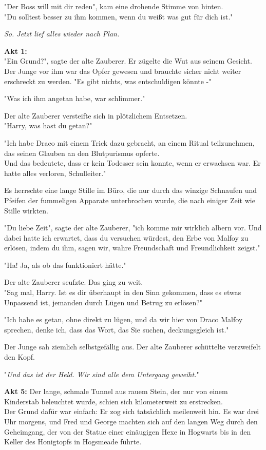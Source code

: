 {"Der Boss will mit dir reden", kam eine drohende Stimme von hinten.\\ "Du solltest besser zu ihm kommen, wenn du weißt was gut für dich ist."

\emph{So. Jetzt lief alles wieder nach Plan.}

\textbf{Akt 1:}\\ "Ein Grund?", sagte der alte Zauberer. Er zügelte die Wut aus seinem Gesicht.\\ Der Junge vor ihm war das Opfer gewesen und brauchte sicher nicht weiter erschreckt zu werden. "Es gibt nichts, was entschuldigen könnte -"

"Was ich ihm angetan habe, war schlimmer."

Der alte Zauberer versteifte sich in plötzlichem Entsetzen.\\ "Harry, was hast du getan?"

"Ich habe Draco mit einem Trick dazu gebracht, an einem Ritual teilzunehmen, das seinen Glauben an den Blutpurismus opferte.\\ Und das bedeutete, dass er kein Todesser sein konnte, wenn er erwachsen war. Er hatte alles verloren, Schulleiter."

Es herrschte eine lange Stille im Büro, die nur durch das winzige Schnaufen und Pfeifen der fummeligen Apparate unterbrochen wurde, die nach einiger Zeit wie Stille wirkten.

"Du liebe Zeit", sagte der alte Zauberer, "ich komme mir wirklich albern vor. Und dabei hatte ich erwartet, dass du versuchen würdest, den Erbe von Malfoy zu erlösen, indem du ihm, sagen wir, wahre Freundschaft und Freundlichkeit zeigst."

"Ha! Ja, als ob das funktioniert hätte."

Der alte Zauberer seufzte. Das ging zu weit.\\ "Sag mal, Harry. Ist es dir überhaupt in den Sinn gekommen, dass es etwas Unpassend ist, jemanden durch Lügen und Betrug zu erlösen?"

"Ich habe es getan, ohne direkt zu lügen, und da wir hier von Draco Malfoy sprechen, denke ich, dass das Wort, das Sie suchen, deckungsgleich ist."

Der Junge sah ziemlich selbstgefällig aus. Der alte Zauberer schüttelte verzweifelt den Kopf.

"\emph{Und das ist der Held. Wir sind alle dem Untergang geweiht.}"

\textbf{Akt 5:} Der lange, schmale Tunnel aus rauem Stein, der nur von einem Kinderstab beleuchtet wurde, schien sich kilometerweit zu erstrecken.\\ Der Grund dafür war einfach: Er zog sich tatsächlich meilenweit hin. Es war drei Uhr morgens, und Fred und George machten sich auf den langen Weg durch den Geheimgang, der von der Statue einer einäugigen Hexe in Hogwarts bis in den Keller des Honigtopfs in Hogsmeade führte.

}
